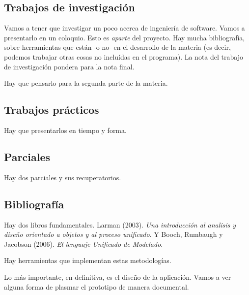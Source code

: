 \subsection{Trabajos de investigación}

Vamos a tener que investigar un poco acerca de ingeniería de software.
Vamos a presentarlo en un coloquio. Esto es \textit{aparte} del proyecto.
Hay mucha bibliografía, 
sobre herramientas que están -o no-
en el desarrollo de la materia
(es decir, podemos trabajar otras cosas no incluídas en el programa).
La nota del trabajo de investigación pondera para la nota final.

Hay que pensarlo para la segunda parte de la materia.

\subsection{Trabajos prácticos}

Hay que presentarlos en tiempo y forma.

\subsection{Parciales}

Hay dos parciales y sus recuperatorios.

\subsection{Bibliografía}

Hay dos libros fundamentales.
Larman (2003). \textit{Una introducción al analisis y diseño orientado a objetos y al proceso unificado}. 
Y Booch, Rumbaugh y Jacobson (2006). \textit{El lenguaje Unificado de Modelado}.

Hay herramientas que implementan estas metodologías.

Lo más importante, en definitiva,
es el diseño de la aplicación.
Vamos a ver alguna forma de plasmar el prototipo de manera documental.
